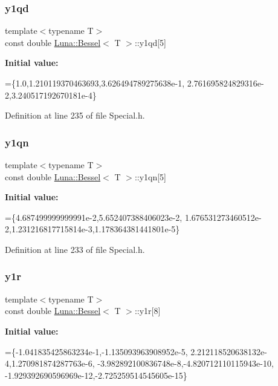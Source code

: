 \subsubsection{\texorpdfstring{y1qd}{y1qd}}
{\footnotesize\ttfamily template$<$typename T$>$ \\
const double \hyperlink{structLuna_1_1Bessel}{Luna\+::\+Bessel}$<$ T $>$\+::y1qd\mbox{[}5\mbox{]}}

{\bfseries Initial value\+:}
\begin{DoxyCode}
=\{1.0,1.210119370463693,3.626494789275638e-1,
        2.761695824829316e-2,3.240517192670181e-4\}
\end{DoxyCode}


Definition at line 235 of file Special.\+h.

\mbox{\label{structLuna_1_1Bessel_ad1bcc14a49575518e9e8227621b39129}} 
\subsubsection{\texorpdfstring{y1qn}{y1qn}}
{\footnotesize\ttfamily template$<$typename T$>$ \\
const double \hyperlink{structLuna_1_1Bessel}{Luna\+::\+Bessel}$<$ T $>$\+::y1qn\mbox{[}5\mbox{]}}

{\bfseries Initial value\+:}
\begin{DoxyCode}
=\{4.687499999999991e-2,5.652407388406023e-2,
        1.676531273460512e-2,1.231216817715814e-3,1.178364381441801e-5\}
\end{DoxyCode}


Definition at line 233 of file Special.\+h.

\mbox{\label{structLuna_1_1Bessel_a558dbb69ececd5b2e46447709c99077e}} 
\subsubsection{\texorpdfstring{y1r}{y1r}}
{\footnotesize\ttfamily template$<$typename T$>$ \\
const double \hyperlink{structLuna_1_1Bessel}{Luna\+::\+Bessel}$<$ T $>$\+::y1r\mbox{[}8\mbox{]}}

{\bfseries Initial value\+:}
\begin{DoxyCode}
=\{-1.041835425863234e-1,-1.135093963908952e-5,
        2.212118520638132e-4,1.270981874287763e-6,
        -3.982892100836748e-8,-4.820712110115943e-10,
        -1.929392690596969e-12,-2.725259514545605e-15\}
\end{DoxyCode}


